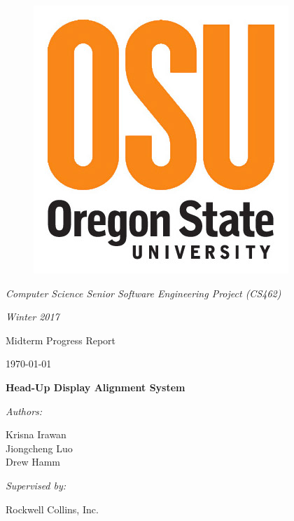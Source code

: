 \documentclass[letterpaper,10pt,onecolumn]{IEEEtran}
\def\name{Krisna Irawan\\ Jiongcheng Luo\\ Drew Hamm}
\def\doc{Midterm Progress Report}
\begin{document}
\begin{titlepage}
	\centering
	\begin{figure}
	      	\includegraphics[scale=0.25]{osu_logo}
	\end{figure}
	{\Large\itshape Computer Science Senior Software Engineering Project (CS462)\par}
	{\Large\itshape Winter 2017\par}
	\vspace{1cm}
	\scshape{
		{\huge\doc\par}
		{\large \today\par}
		\vspace{1cm}
		{\Huge\bfseries Head-Up Display Alignment System\par}
	}
	\vspace{2cm}
	{\large\itshape Authors:\par}
	{\large \name\par}
	\vspace{1cm}
	{\large\itshape Supervised by:\par}
	{\large Rockwell Collins, Inc.\par}
	\vspace{5cm}


	\begin{abstract}
	TODO: This is a progress report that keeps track of our project progress for the first half of winter term. The document consists of three main sections that each section reflecting each individual group member. The report mainly introduces our current stage of the project, remaining work, the problems we met and their solutions, as well as some pieces of coding and experimental design we have been working on. 
	\end{abstract}
	\vfill
\end{titlepage}
\end{document}
